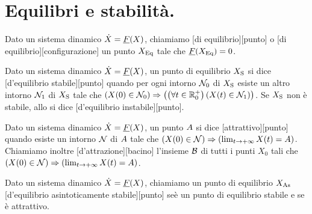 \section{Equilibri e stabilit\`a.}
\label{SistemiDinamici_EquilibriEStabilita}
\begin{Definition}
	Dato un sistema dinamico $\dot{X} = \underline{F}(X)$, chiamiamo [di equilibrio][punto] o [di equilibrio][configurazione] un punto $X_\text{Eq}$ tale che $\underline{F}(X_\text{Eq}) = 0$.
\end{Definition}
\begin{Definition}
	Dato un sistema dinamico $\dot{X} = \underline{F}(X)$, un punto di equilibrio $X_\text{S}$ si dice [d'equilibrio stabile][punto] quando per ogni intorno $\mathcal{N}_0$ di $X_\text{S}$ esiste un altro intorno $\mathcal{N}_1$ di $X_\text{S}$ tale che $\left ( X(0) \in \mathcal{N}_0 \right ) \Rightarrow \left ( \left ( \forall t \in \mathbb{R}^+_0 \right ) \left ( X(t) \in \mathcal{N}_1 \right ) \right )$. Se $X_\text{S}$ non \`e stabile, allo si dice [d'equilibrio instabile][punto].
\end{Definition}
\begin{Definition}
	Dato un sistema dinamico $\dot{X} = \underline{F}(X)$, un punto $A$ si dice [attrattivo][punto] quando esiste un intorno $\mathcal{N}$ di $A$ tale che $\left ( X(0) \in \mathcal{N} \right ) \Rightarrow \left ( \lim_{t \rightarrow + \infty} X(t) = A \right )$. Chiamiamo inoltre [d'attrazione][bacino] l'insieme $\mathcal{B}$ di tutti i punti $X_0$ tali che $\left ( X(0) \in \mathcal{N} \right ) \Rightarrow \left ( \lim_{t \rightarrow + \infty} X(t) = A \right )$.
\end{Definition}
\begin{Definition}
	Dato un sistema dinamico $\dot{X} = \underline{F}(X)$, chiamiamo un punto di equilibrio $X_\text{As}$ [d'equilibrio asintoticamente stabile][punto] se\`e un punto di equilibrio stabile e se \`e attrattivo.
\end{Definition}
